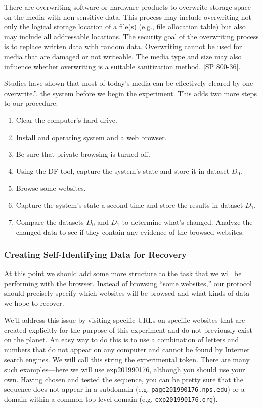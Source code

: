 There are overwriting software or hardware products to overwrite storage space on the 
media with non-sensitive data. This process may include overwriting not only the logical 
storage location of a file(s) (e.g., file allocation table) but also may include all addressable 
locations. The security goal of the overwriting process is to replace written data with 
random data. Overwriting cannot be used for media that are damaged or not writeable. 
The media type and size may also influence whether overwriting is a suitable sanitization 
method. [SP 800-36]. 

Studies have shown that most of today’s media can be effectively cleared by one overwrite.''\cite{nist800-88}.
the system before we begin the
experiment. This adds two more steps to our procedure:

\begin{enumerate}
\item Clear the computer's hard drive.
\item Install and operating system and a web browser.
\item Be sure that private browsing is turned off.
\item Using the DF tool, capture the system's state and store it in dataset $D_0$.
\item Browse some websites.
\item Capture the system's state a second time and store the results in dataset $D_1$.
\item Compare the datasets $D_0$ and $D_1$ to determine what's
  changed. Analyze the changed data to see if they contain any
  evidence of the browsed websites. 
\end{enumerate}


\subsubsection{Creating Self-Identifying Data for Recovery}
At this point we should add some more structure to the task that we
will be performing with the browser. Instead of browsing ``some
websites,'' our protocol should precisely specify which websites will
be browsed and what kinds of data we hope to recover. 

We'll address this issue by visiting specific URLs on specific
websites that are created explicitly for the purpose of this
experiment and do not previously exist on the planet. 
An easy way to do this is to use a combination of letters and
numbers that do not appear on any computer and cannot be found by
Internet search engines. We will call this string the experimental
token. There are many such examples---here we will
use exp201990176, although you should use your own. Having chosen and
tested the sequence, you can be pretty sure that the sequence does not
appear in a subdomain (e.g. \texttt{page201990176.nps.edu}) or a domain
  within a common top-level domain (e.g. \texttt{exp201990176.org}).

